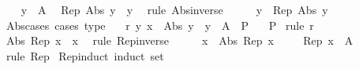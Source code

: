 \begin{isabellebody}
\ \ \isamarkupfalse%
\ {\isacartoucheopen}y\ {\isasymin}\ A{\isacartoucheclose}\ \isamarkupfalse%
\ {\isachardoublequoteopen}Rep\ {\isacharparenleft}{\kern0pt}Abs\ y{\isacharparenright}{\kern0pt}\ {\isacharequal}{\kern0pt}\ y{\isachardoublequoteclose}\ \isamarkupfalse%
\ {\isacharparenleft}{\kern0pt}rule\ Abs{\isacharunderscore}{\kern0pt}inverse{\isacharparenright}{\kern0pt}\isanewline
\ \ \isamarkupfalse%
\ \isamarkupfalse%
\ {\isachardoublequoteopen}y\ {\isacharequal}{\kern0pt}\ Rep\ {\isacharparenleft}{\kern0pt}Abs\ y{\isacharparenright}{\kern0pt}{\isachardoublequoteclose}\ \isacommand{{\isachardot}{\kern0pt}{\isachardot}{\kern0pt}}\isamarkupfalse%
\isanewline
{}\isamarkupfalse%
%
\endisatagproof
{\isafoldproof}%
%
\isadelimproof
\isanewline
%
\endisadelimproof
\isanewline
{}\isamarkupfalse%
\ Abs{\isacharunderscore}{\kern0pt}cases\ {\isacharbrackleft}{\kern0pt}cases\ type{\isacharbrackright}{\kern0pt}{\isacharcolon}{\kern0pt}\isanewline
\ \ \ r{\isacharcolon}{\kern0pt}\ {\isachardoublequoteopen}{\isasymAnd}y{\isachardot}{\kern0pt}\ x\ {\isacharequal}{\kern0pt}\ Abs\ y\ {\isasymLongrightarrow}\ y\ {\isasymin}\ A\ {\isasymLongrightarrow}\ P{\isachardoublequoteclose}\isanewline
\ \ \ P\isanewline
%
\isadelimproof
%
\endisadelimproof
%
\isatagproof
{}\isamarkupfalse%
\ {\isacharparenleft}{\kern0pt}rule\ r{\isacharparenright}{\kern0pt}\isanewline
\ \ \isamarkupfalse%
\ {\isachardoublequoteopen}Abs\ {\isacharparenleft}{\kern0pt}Rep\ x{\isacharparenright}{\kern0pt}\ {\isacharequal}{\kern0pt}\ x{\isachardoublequoteclose}\ \isamarkupfalse%
\ {\isacharparenleft}{\kern0pt}rule\ Rep{\isacharunderscore}{\kern0pt}inverse{\isacharparenright}{\kern0pt}\isanewline
\ \ \isamarkupfalse%
\ \isamarkupfalse%
\ {\isachardoublequoteopen}x\ {\isacharequal}{\kern0pt}\ Abs\ {\isacharparenleft}{\kern0pt}Rep\ x{\isacharparenright}{\kern0pt}{\isachardoublequoteclose}\ \isacommand{{\isachardot}{\kern0pt}{\isachardot}{\kern0pt}}\isamarkupfalse%
\isanewline
\ \ \isamarkupfalse%
\ {\isachardoublequoteopen}Rep\ x\ {\isasymin}\ A{\isachardoublequoteclose}\ \isamarkupfalse%
\ {\isacharparenleft}{\kern0pt}rule\ Rep{\isacharparenright}{\kern0pt}\isanewline
{}\isamarkupfalse%
%
\endisatagproof
{\isafoldproof}%
%
\isadelimproof
\isanewline
%
\endisadelimproof
\isanewline
{}\isamarkupfalse%
\ Rep{\isacharunderscore}{\kern0pt}induct\ {\isacharbrackleft}{\kern0pt}induct\ set{\isacharbrackright}{\kern0pt}{\isacharcolon}{\kern0pt}\isanewline

\end{isabellebody}
